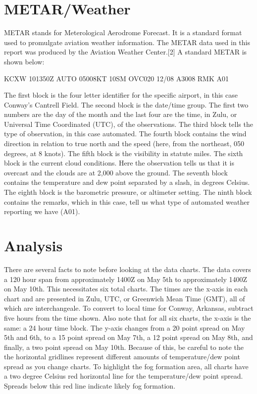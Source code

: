 \documentclass{article}
\begin{document}
\section{METAR/Weather}
METAR stands for Meterological Aerodrome Forecast. It is a standard format used to promulgate aviation weather information. The METAR data used in this report was produced by the Aviation Weather Center.[2] A standard METAR is shown below:
\medskip
\begin{center}
KCXW 101350Z AUTO 05008KT 10SM OVC020 12/08 A3008 RMK A01
\end{center}
\medskip
The first block is the four letter identifier for the specific airport, in this case Conway's Cantrell Field. The second block is the date/time group. The first two numbers are the day of the month and the last four are the time, in Zulu, or Universal Time Coordinated (UTC), of the observations. The third block tells the type of observation, in this case automated. The fourth block contains the wind direction in relation to true north and the speed (here, from the northeast, 050 degrees, at 8 knots). The fifth block is the visibility in statute miles. The sixth block is the current cloud conditions. Here the observation tells us that it is overcast and the clouds are at 2,000 above the ground. The seventh block contains the temperature and dew point separated by a slash, in degrees Celsius. The eighth block is the barometric pressure, or altimeter setting. The ninth block contains the remarks, which in this case, tell us what type of automated weather reporting we have (A01). 

\section{Analysis}
There are several facts to note before looking at the data charts. The data covers a 120 hour span from approximately 1400Z on May 5th to approximately 1400Z on May 10th. This necessitates six total charts. The times are the x-axis in each chart and are presented in Zulu, UTC, or Greenwich Mean Time (GMT), all of which are interchangeale. To convert to local time for Conway, Arkansas, subtract five hours from the time shown. Also note that for all six charts, the x-axis is the same: a 24 hour time block. The y-axis changes from a 20 point spread on May 5th and 6th, to a 15 point spread on May 7th, a 12 point spread on May 8th, and finally, a two point spread on May 10th. Because of this, be careful to note the the horizontal gridlines represent different amounts of temperature/dew point spread as you change charts. To highlight the fog formation area, all charts have a two degree Celsius red horizontal line for the temperature/dew point spread. Spreads below this red line indicate likely fog formation.
\end{document}
